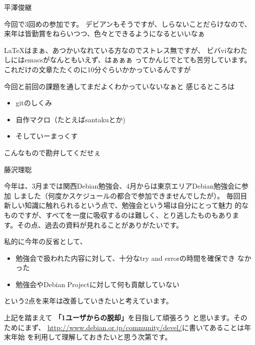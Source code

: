 \begin{prework}{平澤俊継}

今回で3回めの参加です。
デビアンもそうですが、しらないことだらけなので、
来年は皆勤賞をねらいつつ、色々とできるようになるといいなぁ

\LaTeX{}はまぁ、あつかいなれている方なのでストレス無ですが、
ビバviなわたしにはemacsがなんともいえず、はぁぁぁ
ってかんじでとても苦労しています。
これだけの文章たたくのに10分ぐらいかかっているんですが

今回と前回の課題を通してまだよくわかっていないなぁと
感じるところは
\begin{itemize}
 \item gitのしくみ
 \item 自作マクロ（たとえばsantakuとか)
 \item そしていーまっくす
\end{itemize}

こんなもので勘弁してくだせぇ

\end{prework}
\begin{prework}{藤沢理聡}


今年は、3月までは関西Debian勉強会、4月からは東京エリアDebian勉強会に参加
しました（何度かスケジュールの都合で参加できませんでしたが）。
毎回目新しい知識に触れられるという点で、勉強会という場は自分にとって魅力
的なものですが、すべてを一度に吸収するのは難しく、とり逃したものもありま
す。その点、過去の資料が見れることがありがたいです。

私的に今年の反省として、
\begin{itemize}
\item 勉強会で扱われた内容に対して、十分なtry and errorの時間を確保でき
      なかった
\item 勉強会やDebian Projectに対して何も貢献していない
\end{itemize}
という2点を来年は改善していきたいと考えています。


上記を踏まえて \textbf{「1ユーザからの脱却」}を目指して頑張ろう
と思います。そのためにまず、
\url{http://www.debian.or.jp/community/devel/}に書いてあることは年末年始
を利用して理解しておきたいと思う次第です。

\end{prework}
